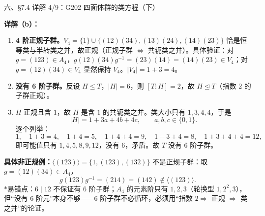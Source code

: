 \documentclass[aspectratio=169,10pt,fontset=none]{ctexbeamer}
\newcommand{\key}[1]{\textcolor{ink}{\bfseries #1}}
\newcommand{\starpt}{\textcolor{accent}{\bfseries$\ast$}}
\begin{document}
\begin{frame}[t]{六、\S7.4 详解 4/9：G202 四面体群的类方程（下）}
\scriptsize

\key{详解（b）：}
\begin{enumerate}\setlength{\itemsep}{1pt}
\item \textbf{4 阶正规子群。}$V_4=\{1\}\cup\{(12)(34),(13)(24),(14)(23)\}$ 恰是恒等类与半转类之并，故正规（正规子群 $\Leftrightarrow$ 共轭类之并）。具体验证：对 $g=(123)\in A_4$，$g(12)(34)g^{-1}=(23)(14)=(14)(23)\in V_4$；对 $g=(12)(34)\in V_4$ 显然保持 $V_4$。$|V_4|=1+3=4$。
\item \textbf{没有 6 阶子群。}反设 $H\le T$，$|H|=6$，则 $[T:H]=2$，故 $H\trianglelefteq T$（指数 $2$ 的子群正规）。
\item $H$ 正规且含 $1$，故 $H$ 是含 $1$ 的共轭类之并。类大小只有 $1,3,4,4$，于是
\[ |H|=1+3a+4b+4c,\qquad a,b,c\in\{0,1\}. \]
逐个列举：
\[ 1,\quad 1+3=4,\quad 1+4=5,\quad 1+4+4=9,\quad 1+3+4=8,\quad 1+3+4+4=12, \]
即可能值只有 $1,4,5,8,9,12$，没有 $6$，矛盾。故 $T$ 没有 $6$ 阶子群。
\end{enumerate}
\key{具体非正规例：}$\langle(123)\rangle=\{1,(123),(132)\}$ 不是正规子群：取 $g=(12)(34)\in A_4$，
\[ g(123)g^{-1}=(214)=(142)\notin\langle(123)\rangle. \]
\starpt 易错点：$6\mid12$ 不保证有 $6$ 阶子群；$A_4$ 的元素阶只有 $1,2,3$（轮换型 $1,2^2,3$），但“没有 6 阶元”本身不够——6 阶子群不必循环，必须用“指数 $2\Rightarrow$ 正规 $\Rightarrow$ 类之并”的论证。
\end{frame}
\end{document}

